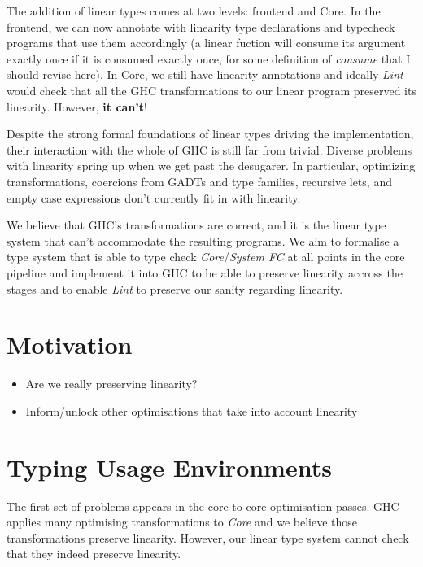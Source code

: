 \documentclass[a4paper, draft]{article}
\begin{document}
The addition of linear types comes at two levels: frontend and Core.
In the frontend, we can now annotate with linearity type declarations and
typecheck programs that use them accordingly (a linear fuction will consume its
argument exactly once if it is consumed exactly once, for some definition of
\emph{consume} that I should revise here). In Core, we still have linearity
annotations and ideally \emph{Lint} would check that all the GHC transformations
to our linear program preserved its linearity. However, \textbf{it can't}!

Despite the strong formal foundations of linear types driving the
implementation, their interaction with the whole of GHC is still far from
trivial. Diverse problems with linearity spring up when we get past the
desugarer. In particular, optimizing transformations, coercions from GADTs and
type families, recursive lets, and empty case expressions don't currently fit in
with linearity.

We believe that GHC's transformations are correct, and it is the linear type
system that can't accommodate the resulting programs. We aim to formalise a type
system that is able to type check \emph{Core}/\emph{System FC} at all points in
the core pipeline and implement it into GHC to be able to preserve linearity
accross the stages and to enable \emph{Lint} to preserve our sanity regarding
linearity.

\section{Motivation}

\begin{itemize}
    \item Are we really preserving linearity?
    \item Inform/unlock other optimisations that take into account linearity
\end{itemize}


\section{Typing Usage Environments}

The first set of problems appears in the core-to-core optimisation passes. GHC
applies many optimising transformations to \emph{Core} and we believe those
transformations preserve linearity. However, our linear type system cannot check
that they indeed preserve linearity.
\end{document}
